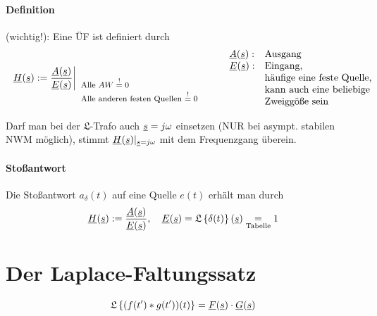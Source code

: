 \paragraph{Definition} (wichtig!): Eine ÜF ist definiert durch
  \[\left.\cn{H}(\cn{s}) := 
    \frac{\cn{A}(\cn{s})}{\cn{E}(\cn{s})}\right|_{\begin{array}{l}
      \text{\footnotesize Alle $AW\stackrel{!}{=}0$}\\
      \text{\footnotesize Alle anderen festen Quellen $\stackrel{!}{=}0$}
    \end{array}}
    \qquad
    \begin{array}{lp{3cm}}
      \cn{A}(\cn{s}): &\text{Ausgang}  \\
      \cn{E}(\cn{s}): &\text{Eingang,}
        \text{häufige eine feste Quelle,}
        \text{kann auch eine beliebige}
        \text{Zweiggöße sein}
    \end{array}\]

  Darf man bei der $\mathfrak{L}$-Trafo auch $\underline{s}=j\omega$ einsetzen
  (NUR bei asympt. stabilen NWM möglich), stimmt 
  $\underline{H}(\underline{s})|_{\underline{s}=j\omega}$ mit dem Frequenzgang überein.

\paragraph{Stoßantwort}
  Die Stoßantwort $a_\delta(t)$ auf eine Quelle $e(t)$ erhält man durch
  \[\underline{H}(\underline{s}) := \frac{\underline{A}(\underline{s})}{\underline{E}(\underline{s})},\quad
    \underline{E}(\underline{s}) = \mathfrak{L}\left\{\delta(t)\right\}(\underline{s}) \underset{\text{Tabelle}}{=} 1\]

\section{Der Laplace-Faltungssatz}
  \[\mathfrak{L}\left\{(f(t')\ast g(t'))(t)\right\} = \underline{F}(\underline{s})\cdot\underline{G}(\underline{s})\]

